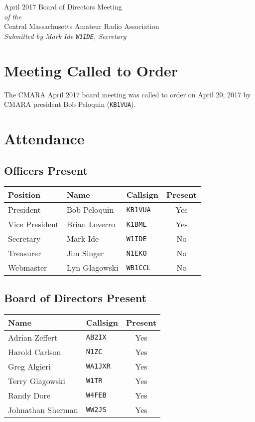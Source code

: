 \documentclass[10pt,letterpaper]{article}
\begin{document}
\begin{center}
{\huge April 2017 Board of Directors Meeting}\\
\emph{of the}\\
{\Large Central Massachusetts Amateur Radio Association}\\
\emph{Submitted by Mark Ide \texttt{W1IDE}, Secretary}
\end{center}

\section{Meeting Called to Order}
The CMARA April 2017 board meeting was called to order on April 20, 2017 by CMARA president Bob Peloquin (\texttt{KB1VUA}).

\section{Attendance}

\subsection{Officers Present}
\begin{tabular}{|l|l|l|c|}
  \hline
  \textbf{Position} & \textbf{Name}  & \textbf{Callsign} & \textbf{Present} \\ \hline
  President         & Bob Peloquin   & \texttt{KB1VUA}   & Yes \\
  Vice President    & Brian Loverro  & \texttt{K1BML}    & Yes \\
  Secretary         & Mark Ide       & \texttt{W1IDE}    & No \\
  Treasurer         & Jim Singer     & \texttt{N1EKO}    & No \\
  Webmaster         & Lyn Glagowski  & \texttt{WB1CCL}   & No \\
  \hline
\end{tabular}

\subsection{Board of Directors Present}
\begin{tabular}{|l|l|c|}
  \hline
  \textbf{Name}     & \textbf{Callsign} & \textbf{Present} \\ \hline
  Adrian Zeffert    & \texttt{AB2IX}    & Yes \\
  Harold Carlson    & \texttt{N1ZC}     & Yes \\
  Greg Algieri      & \texttt{WA1JXR}   & Yes \\
  Terry Glagowski   & \texttt{W1TR}     & Yes \\
  Randy Dore        & \texttt{W4FEB}    & Yes \\
  Johnathan Sherman & \texttt{WW2JS}    & Yes \\
  \hline
\end{tabular}
\end{document}
